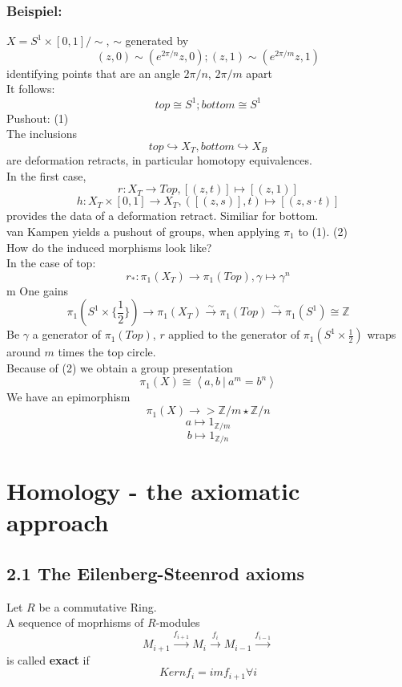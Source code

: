 \documentclass{book}
\newcommand{\Bsp}[1]{\subsection{Beispiel: #1}}
\newcommand{\df}[1]{\textbf{#1}\index{#1}}
\newcommand{\Z}{\mathbb{Z}}
\begin{document}
\Bsp{}
$X = S^1\times [0,1]/\sim$, $\sim$ generated by
\[(z,0) \sim (e^{2\pi /n}z,0) ; (z,1) \sim (e^{2\pi /m}z,1) \]
identifying points that are  an angle $2\pi /n$, $2\pi/m$ apart\\
It follows:
\[top \cong S^1; bottom \cong S^1 \]
Pushout: (1)\\

The inclusions
\[top \hookrightarrow X_{T}, bottom \hookrightarrow X_B \]
are deformation retracts, in particular homotopy equivalences.\\

In the first case,
\[r: X_T \longrightarrow Top, [(z,t)] \longmapsto [(z,1)]\]
\[h: X_T\times [0,1]\longrightarrow X_T, ([(z,s)],t) \longmapsto [(z,s\cdot t)] \]
provides the data of a deformation retract. Similiar for bottom.\\

van Kampen yields a pushout of groups, when applying $\pi_1$ to (1).
(2)\\

How do the induced morphisms look like?\\
In the case of top:
\[r_* : \pi_1(X_T) \longrightarrow \pi_1(Top), \gamma \longmapsto \gamma^n \]m
One gains
\[\pi_1(S^1\times \{\frac{1}{2}\}) \longrightarrow \pi_1(X_T) \overset{\sim}{\longrightarrow} \pi_1(Top) \overset{\sim}{\longrightarrow} \pi_1(S^1) \cong \Z  \]
Be $\gamma$ a generator of $\pi_1(Top)$, $r$ applied to the generator of $\pi_1(S^1\times \frac{1}{2})$ wraps around $m$ times the top circle.\\

Because of (2) we obtain a group presentation
\[\pi_1(X) \cong \left\langle a,b~|~a^m = b^n \right\rangle \]
We have an epimorphism
\[\pi_1(X) \longrightarrow > \Z/m \star \Z /n \]
\[a \longmapsto 1_{\Z/m}\]
\[b \longmapsto 1_{\Z/n}\]

\newpage

\chapter{Homology - the axiomatic approach}

\section{2.1 The Eilenberg-Steenrod axioms}
Let $R$ be a commutative Ring.\\

A sequence of moprhisms of $R$-modules
\[M_{i+1} \overset{f_{i+1}}{\longrightarrow} M_i \overset{f_{i}}{\longrightarrow} M_{i-1} \overset{f_{i-1}}{\longrightarrow}\]
is called \df{exact} if
\[Kern f_i = im f_{i+1} \forall i\]
\end{document}
